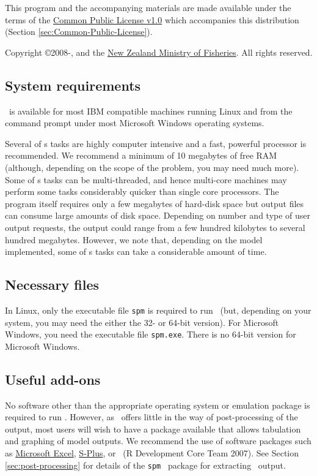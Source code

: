This program and the accompanying materials are made available under the terms of the \href{http://www.opensource.org/licenses/cpl1.0.php}{Common Public License v1.0} which accompanies this distribution (Section \ref{sec:Common-Public-License}).

Copyright \copyright 2008-\SourceControlYearDoc, \href{http://www.niwa.co.nz}{\Organisation} and the \href{http://www.fish.govt.nz}{New Zealand Ministry of Fisheries}. All rights reserved.

\subsection{System requirements}

\SPM\ is available for most IBM compatible machines running Linux and from the command prompt under most Microsoft Windows operating systems.

Several of \SPM s tasks are highly computer intensive and a fast, powerful processor is recommended. We recommend a minimum of 10 megabytes of free RAM (although, depending on the scope of the problem, you may need much more). Some of \SPM s tasks can be multi-threaded, and hence multi-core machines may perform some tasks considerably quicker than single core processors. The program itself requires only a few megabytes of hard-disk space but output files can consume large amounts of disk space. Depending on number and type of user output requests, the output could range from a few hundred kilobytes to several hundred megabytes. However, we note that, depending on the model implemented, some of \SPM s tasks can take a considerable amount of time.

\subsection{Necessary files}

In Linux, only the executable file \texttt{spm} is required to run \SPM\ (but, depending on your system, you may need the either the 32- or 64-bit version). For Microsoft Windows, you need the executable file \texttt{spm.exe}. There is no 64-bit version for Microsoft Windows.

\subsection{Useful add-ons}

No software other than the appropriate operating system or emulation package is required to run \SPM. However, as \SPM\ offers little in the way of  post-processing of the output, most users will wish to have a package available that allows tabulation and graphing of model outputs. We recommend the use of software packages such as \href{http://www.microsoft.com}{Microsoft Excel}, \href{http://www.insightful.com}{S-Plus}, or \href{http://www.r-project.org}{\R}\ (R Development Core Team 2007). See Section \ref{sec:post-processing} for details of the \texttt{spm} \R\ package for extracting \SPM\ output.

